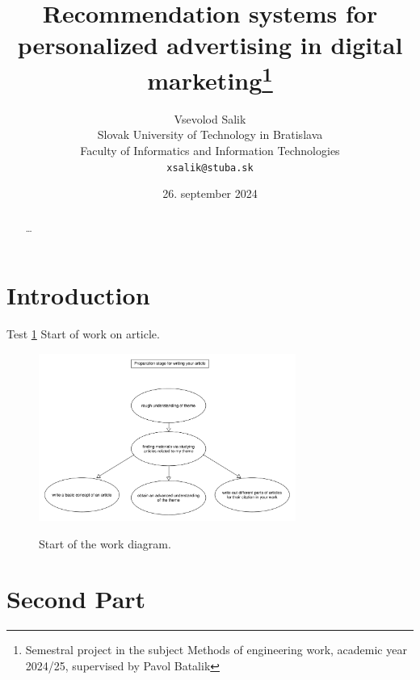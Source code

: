 \documentclass[10pt,twoside,english,a4paper]{article}
\title{Recommendation systems for personalized advertising in digital marketing\thanks{Semestral project in the subject Methods of engineering work, academic year 2024/25, supervised by Pavol Batalik}} %
\author{Vsevolod Salik\\[2pt]
	{\small Slovak University of Technology in Bratislava }\\
	{\small Faculty of Informatics and Information Technologies }\\
	{\small \texttt{xsalik@stuba.sk}}
	}
\date{\small 26. september 2024} %
\begin{document}
\maketitle

\begin{abstract}
\ldots
\end{abstract}



\section{Introduction}
Test
\ref{fig:dia1} Start of work on article.


\begin{figure}[h!]
	\includegraphics[width=0.75\textwidth]{diagram_1.pdf}
 	\label{fig:dia1}
	
	\caption{Start of the work diagram.}
\end{figure}




\section{Second Part}



% 
\end{document}
